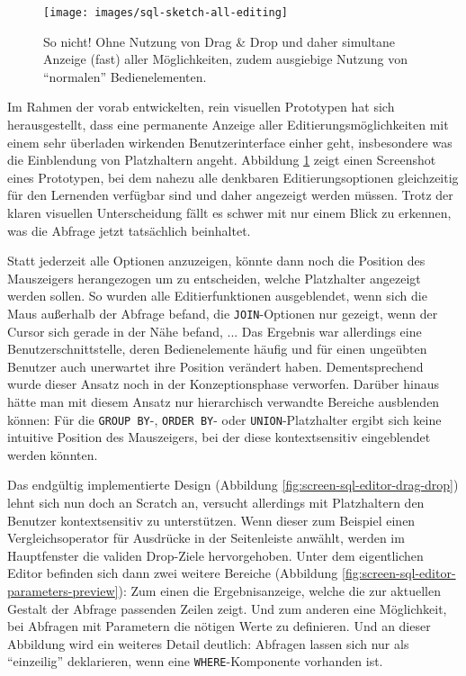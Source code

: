 \begin{figure}[p]
  \texttt{[image: images/sql-sketch-all-editing]}
  \caption{So nicht! Ohne Nutzung von Drag \& Drop und daher simultane Anzeige (fast) aller Möglichkeiten, zudem ausgiebige Nutzung von "`normalen"' Bedienelementen.}
  \label{fig:screen-sql-editor-all-editing}
\end{figure}

Im Rahmen der vorab entwickelten, rein visuellen Prototypen hat sich herausgestellt, dass eine permanente Anzeige aller Editierungsmöglichkeiten mit einem sehr überladen wirkenden Benutzerinterface einher geht, insbesondere was die Einblendung von Platzhaltern angeht. Abbildung \ref{fig:screen-sql-editor-all-editing} zeigt einen Screenshot eines Prototypen, bei dem nahezu alle denkbaren Editierungsoptionen gleichzeitig für den Lernenden verfügbar sind und daher angezeigt werden müssen. Trotz der klaren visuellen Unterscheidung fällt es schwer mit nur einem Blick zu erkennen, was die Abfrage jetzt tatsächlich beinhaltet.

Statt jederzeit alle Optionen anzuzeigen, könnte dann noch die Position des Mauszeigers herangezogen um zu entscheiden, welche Platzhalter angezeigt werden sollen. So wurden alle Editierfunktionen ausgeblendet, wenn sich die Maus außerhalb der Abfrage befand, die \texttt{JOIN}-Optionen nur gezeigt, wenn der Cursor sich gerade in der Nähe befand, ... Das Ergebnis war allerdings eine Benutzerschnittstelle, deren Bedienelemente häufig und für einen ungeübten Benutzer auch unerwartet ihre Position verändert haben. Dementsprechend wurde dieser Ansatz noch in der Konzeptionsphase verworfen. Darüber hinaus hätte man mit diesem Ansatz nur hierarchisch verwandte Bereiche ausblenden können: Für die \texttt{GROUP BY}-, \texttt{ORDER BY}- oder \texttt{UNION}-Platzhalter ergibt sich keine intuitive Position des Mauszeigers, bei der diese kontextsensitiv eingeblendet werden könnten.

Das endgültig implementierte Design (Abbildung \ref{fig:screen-sql-editor-drag-drop}) lehnt sich nun doch an Scratch an, versucht allerdings mit Platzhaltern den Benutzer kontextsensitiv zu unterstützen. Wenn dieser zum Beispiel einen Vergleichsoperator für Ausdrücke in der Seitenleiste anwählt, werden im Hauptfenster die validen Drop-Ziele hervorgehoben. Unter dem eigentlichen Editor befinden sich dann zwei weitere Bereiche (Abbildung \ref{fig:screen-sql-editor-parameters-preview}): Zum einen die Ergebnisanzeige, welche die zur aktuellen Gestalt der Abfrage passenden Zeilen zeigt. Und zum anderen eine Möglichkeit, bei Abfragen mit Parametern die nötigen Werte zu definieren. Und an dieser Abbildung wird ein weiteres Detail deutlich: Abfragen lassen sich nur als "`einzeilig"' deklarieren, wenn eine \texttt{WHERE}-Komponente vorhanden ist.

